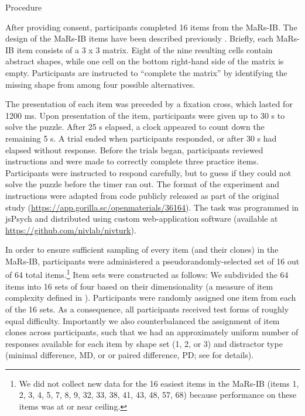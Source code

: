 \documentclass[a4paper,man,natbib]{apa6}
\makeatletter
\renewcommand{\subsubsection}{\@startsection{subsubsection}{3}
  {\z@}%
  {\b@level@two@skip}{\e@level@two@skip}%
  {\normalfont\normalsize\bfseries}}
\makeatother
\begin{document}
\subsubsection{Procedure}

After providing consent, participants completed 16 items from the MaRs-IB. The design of the MaRs-IB items have been described previously \citep{chierchia2019matrix}. Briefly, each MaRs-IB item consists of a 3 x 3 matrix. Eight of the nine resulting cells contain abstract shapes, while one cell on the bottom right-hand side of the matrix is empty. Participants are instructed to ``complete the matrix'' by identifying the missing shape from among four possible alternatives. 

The presentation of each item was preceded by a fixation cross, which lasted for 1200 ms. Upon presentation of the item, participants were given up to 30 s to solve the puzzle. After 25 s elapsed, a clock appeared to count down the remaining 5 s. A trial ended when participants responded, or after 30 s had elapsed without response. Before the trials began, participants reviewed instructions and were made to correctly complete three practice items. Participants were instructed to respond carefully, but to guess if they could not solve the puzzle before the timer ran out. The format of the experiment and instructions were adapted from code publicly released as part of the original study (\url{https://app.gorilla.sc/openmaterials/36164}). The task was programmed in jsPsych \citep{de2015jspsych} and distributed using custom web-application software (available at \url{https://github.com/nivlab/nivturk}). 

In order to ensure sufficient sampling of every item (and their clones) in the MaRs-IB, participants were administered a pseudorandomly-selected set of 16 out of 64 total items.\footnote{We did not collect new data for the 16 easiest items in the MaRs-IB (items 1, 2, 3, 4, 5, 7, 8, 9, 32, 33, 38, 41, 43, 48, 57, 68) because performance on these items was at or near ceiling.} Item sets were constructed as follows: We subdivided the 64 items into 16 sets of four based on their dimensionality (a measure of item complexity defined in \cite{chierchia2019matrix}). Participants were randomly assigned one item from each of the 16 sets. As a consequence, all participants received test forms of roughly equal difficulty. Importantly we also counterbalanced the assignment of item clones across participants, such that we had an approximately uniform number of responses available for each item by shape set (1, 2, or 3) and distractor type (minimal difference, MD, or or paired difference, PD; see \cite{chierchia2019matrix} for details). 
\end{document}
